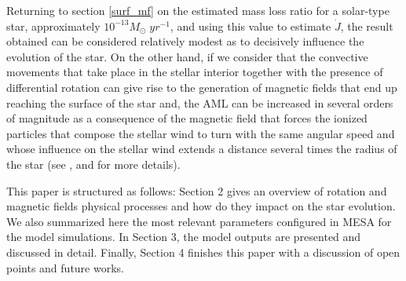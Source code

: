 \documentclass[fleqn,usenatbib]{mnras}
\begin{document}
Returning to section \ref{surf_mf} on the estimated mass loss ratio for a solar-type star, approximately $10^{-13}M_{\odot} \; yr^{-1}$, and using this value to estimate $\Dot{J}$, the result obtained can be considered relatively modest as to decisively influence the evolution of the star. On the other hand, if we consider that the convective movements that take place in the stellar interior together with the presence of differential rotation can give rise to the generation of magnetic fields that end up reaching the surface of the star \citep{Langer2012} and, the AML can be increased in several orders of magnitude as a consequence of the magnetic field that forces the ionized particles that compose the stellar wind to turn with the same angular speed and whose influence on the stellar wind extends a distance several times the radius of the star (see \citet{UdDoula2002}, \citet{Ud-Doula2007} and \citet{Ud-Doula2008} for more details). 

This paper is structured as follows: Section 2 gives an overview of rotation and magnetic fields physical processes and how do they impact on the star evolution. We also summarized here the most relevant parameters configured in MESA for the model simulations. In Section 3, the model outputs are presented and discussed in detail. Finally, Section 4 finishes this paper with a discussion of open points and future works.\par
\end{document}
